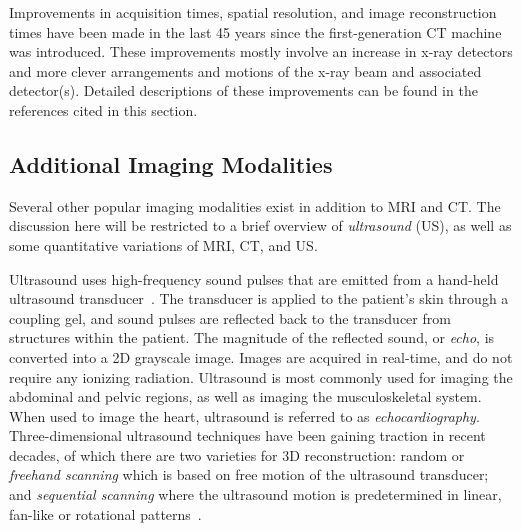 Improvements in acquisition times, spatial resolution, and image reconstruction times have been made in the last 45 years since the first-generation CT machine was introduced. These improvements mostly involve an increase in x-ray detectors and more clever arrangements and motions of the x-ray beam and associated detector(s). Detailed descriptions of these improvements can be found in the references cited in this section.

\subsection{Additional Imaging Modalities}
\label{Other Imaging Modalities}

Several other popular imaging modalities exist in addition to MRI and CT. The discussion here will be restricted to a brief overview of \textit{ultrasound} (US), as well as some quantitative variations of MRI, CT, and US.

Ultrasound uses high-frequency sound pulses that are emitted from a hand-held ultrasound transducer~\cite{waldman_campbell}. The transducer is applied to the patient's skin through a coupling gel, and sound pulses are reflected back to the transducer from structures within the patient. The magnitude of the reflected sound, or \textit{echo}, is converted into a 2D grayscale image. Images are acquired in real-time, and do not require any ionizing radiation. Ultrasound is most commonly used for imaging the abdominal and pelvic regions, as well as imaging the musculoskeletal system. When used to image the heart, ultrasound is referred to as \textit{echocardiography}. Three-dimensional ultrasound techniques have been gaining traction in recent decades, of which there are two varieties for 3D reconstruction: random or \textit{freehand scanning} which is based on free motion of the ultrasound transducer; and \textit{sequential scanning} where the ultrasound motion is predetermined in linear, fan-like or rotational patterns~\cite{valocik_2005, bruining_2000}.

